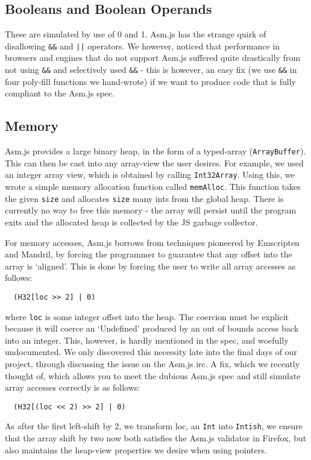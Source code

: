 \documentclass[twoside]{article}
\begin{document}
\begin{multicols}{2}
  \subsection{Booleans and Boolean Operands}
    These are simulated by use of 0 and 1. Asm.js has the strange quirk of disallowing 
    \texttt{\&\&} and \texttt{||} operators. We however, noticed that performance in browsers
    and engines that do not support Asm.js suffered quite drastically from not using \texttt{\&\&}
    and selectively used \texttt{\&\&} - this is however, an easy fix (we use \texttt{\&\&} in 
    four poly-fill functions we hand-wrote) if we want to produce code that is fully compliant 
    to the Asm.js spec. 

  \subsection{Memory}
    Asm.js provides a large binary heap, in the form of a typed-array (\texttt{ArrayBuffer}). 
    This can then be cast into any array-view the user desires. For example, we used an integer array view,
    which is obtained by calling \verb+Int32Array+. Using this, we
    wrote a simple memory allocation function called \texttt{memAlloc}. This function takes the given
    \texttt{size} and allocates \texttt{size} many ints from the global heap. There is currently no way to
    free this memory - the array will persist until the program exits and the allocated heap is collected 
    by the JS garbage collector. 

    For memory accesses, Asm.js borrows from techniques pioneered by 
    Emscripten and Mandril, by forcing the programmer to guarantee that any offset into the array
    is `aligned'. This is done by forcing the user to write all array accesses as follows:
\begin{verbatim}
  (H32[loc >> 2] | 0)
\end{verbatim}
    where \texttt{loc} is some integer offset into the heap. The coercion must be explicit because
    it will coerce an `Undefined' produced by an out of bounds access back into an integer. 
    This, however, is hardly mentioned in the spec, and woefully undocumented. We only discovered
    this necessity late into the final days of our project, through discussing the issue on the
    Asm.js irc. A fix, which we recently thought of, which allows you to meet the dubious Asm.js 
    spec and still simulate array accesses correctly is as follows: 
\begin{verbatim}
  (H32[(loc << 2) >> 2] | 0)
\end{verbatim}
    As after the first left-shift by 2, we transform loc, an \texttt{Int} into \texttt{Intish}, 
    we ensure that the array shift by two now both satisfies the Asm.js validator in Firefox,
    but also maintains the heap-view properties we desire when using pointers. 
    

\end{multicols}
\end{document}
